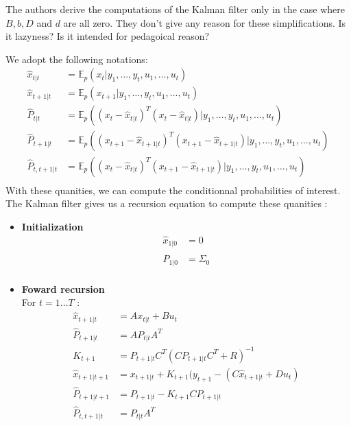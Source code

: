 The authors derive the computations of the Kalman filter only in the case where $B,b,D$ and $d$ are all zero.
They don't give any reason for these simplifications.
Is it lazyness?
Is it intended for pedagoical reason?

We adopt the following notations:
\begin{align*}
  \hat{x}_{t|t} &= \mathbb{E}_p \left (x_t|y_1, \ldots , y_t, u_1, \ldots , u_t \right ) \\
  \hat{x}_{t+1|t} &= \mathbb{E}_p \left (x_{t+1}|y_1, \ldots , y_t, u_1, \ldots , u_t \right ) \\
  \hat{P}_{t|t} &= \mathbb{E}_p \left ((x_t - \hat{x}_{t|t})^T(x_t - \hat{x}_{t|t})|y_1, \ldots , y_t, u_1, \ldots , u_t \right ) \\
  \hat{P}_{t+1|t} &= \mathbb{E}_p \left ((x_{t+1} - \hat{x}_{t+1|t})^T(x_{t+1} - \hat{x}_{t+1|t})|y_1, \ldots , y_t, u_1, \ldots , u_t \right ) \\
  \hat{P}_{t,t+1|t} &= \mathbb{E}_p \left ((x_t - \hat{x}_{t|t})^T(x_{t+1} - \hat{x}_{t+1|t})|y_1, \ldots , y_t, u_1, \ldots , u_t \right ) \\
\end{align*}
With these quanities, we can compute the conditionnal probabilities of interest.
The Kalman filter gives us a recursion equation to compute these quanities :
\begin{itemize}
  \item \textbf{Initialization}\\
    \begin{align*}
      \hat{x}_{1|0} &= 0\\
      \hat{P}_{1|0} &= \Sigma_0\\
    \end{align*}
  \item \textbf{Foward recursion}\\
    For $t=1 \ldots T$ :
    \begin{align*}
      \hat{x}_{t+1|t} &= A x_{t|t} + B u_t\\
      \hat{P}_{t+1|t} &= A P_{t|t} A^T\\
      K_{t+1} &= P_{t+1|t}C^T(C P_{t+1|t} C^T + R)^{-1}\\
      \hat{x}_{t+1|t+1} &= x_{t+1|t} + K_{t+1}(y_{t+1} - (C\hat{x}_{t+1|t} + D u_t)\\
      \hat{P}_{t+1|t+1} &= P_{t+1|t} - K_{t+1} C P_{t+1|t}\\
      \hat{P}_{t,t+1|t} &= P_{t|t}A^T\\
    \end{align*}
\end{itemize}

